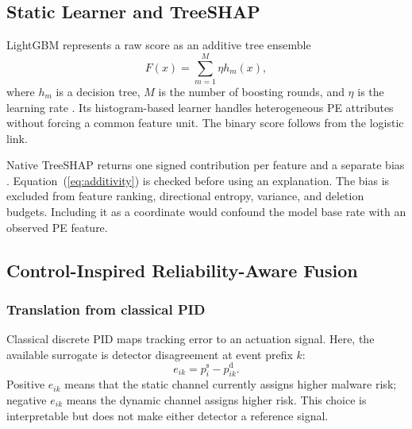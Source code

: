 \subsection{Static Learner and TreeSHAP}

LightGBM represents a raw score as an additive tree ensemble
\begin{equation}
F(x)=\sum_{m=1}^{M}\eta h_m(x),
\label{eq:lgbm}
\end{equation}
where $h_m$ is a decision tree, $M$ is the number of boosting rounds, and $\eta$
is the learning rate \cite{ke2017lightgbm}. Its histogram-based learner handles
heterogeneous PE attributes without forcing a common feature unit. The binary
score follows from the logistic link.

Native TreeSHAP returns one signed contribution per feature and a separate bias
\cite{lundberg2020local}. Equation~(\ref{eq:additivity}) is checked before using
an explanation. The bias is excluded from feature ranking, directional entropy,
variance, and deletion budgets. Including it as a coordinate would confound the
model base rate with an observed PE feature.

\subsection{Control-Inspired Reliability-Aware Fusion}

\subsubsection{Translation from classical PID}

Classical discrete PID maps tracking error to an actuation signal. Here, the
available surrogate is detector disagreement at event prefix $k$:
\begin{equation}
e_{ik}=p_i^{\mathrm{s}}-p_{ik}^{\mathrm{d}}.
\label{eq:pid-error}
\end{equation}
Positive $e_{ik}$ means that the static channel currently assigns higher malware
risk; negative $e_{ik}$ means the dynamic channel assigns higher risk. This
choice is interpretable but does not make either detector a reference signal.

